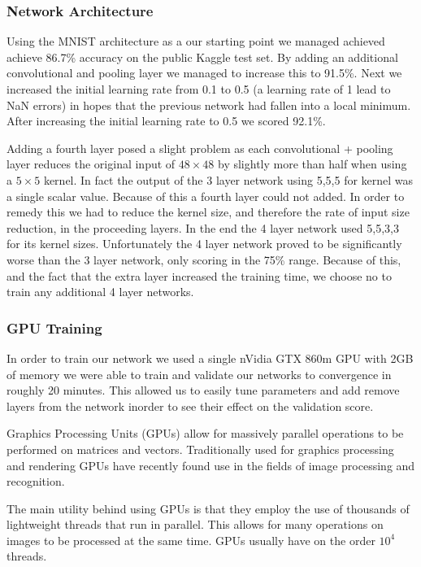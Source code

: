 \documentclass[10pt,twocolumn]{article}
\begin{document}
\subsubsection{Network Architecture}
Using the MNIST architecture as a our starting point we managed achieved achieve 86.7\% accuracy on the public Kaggle test set. By adding an additional convolutional and pooling layer we managed to increase this to 91.5\%. Next we increased the initial learning rate from 0.1 to 0.5 (a learning rate of 1 lead to NaN errors) in hopes that the previous network had fallen into a local minimum. After increasing the initial learning rate to 0.5 we scored 92.1\%. 

Adding a fourth layer posed a slight problem as each convolutional + pooling layer reduces the original input of $48 \times 48$ by slightly more than half when using a $5 \times 5$ kernel. In fact the output of the 3 layer network using 5,5,5 for kernel was a single scalar value. Because of this a fourth layer could not added. In order to remedy this we had to reduce the kernel size, and therefore the rate of input size reduction, in the proceeding layers. In the end the 4 layer network used 5,5,3,3 for its kernel sizes. Unfortunately the 4 layer network proved to be significantly worse than the 3 layer network, only scoring in the 75\% range. Because of this, and the fact that the extra layer increased the training time, we choose no to train any additional 4 layer networks.
 
\subsubsection{GPU Training}
In order to train our network we used a single nVidia GTX 860m GPU with 2GB of memory we were able to train and validate our networks to convergence in roughly 20 minutes. This allowed us to easily tune parameters and add remove layers from the network inorder to see their effect on the validation score.

Graphics Processing Units (GPUs) allow for massively parallel operations to be performed on matrices and vectors. Traditionally used for graphics processing and rendering GPUs have recently found use in the fields of image processing and recognition. 

The main utility behind using GPUs is that they employ the use of thousands of lightweight threads that run in parallel. This allows for many operations on images to be processed at the same time. GPUs usually have on the order $10^4$ threads.
\end{document}
